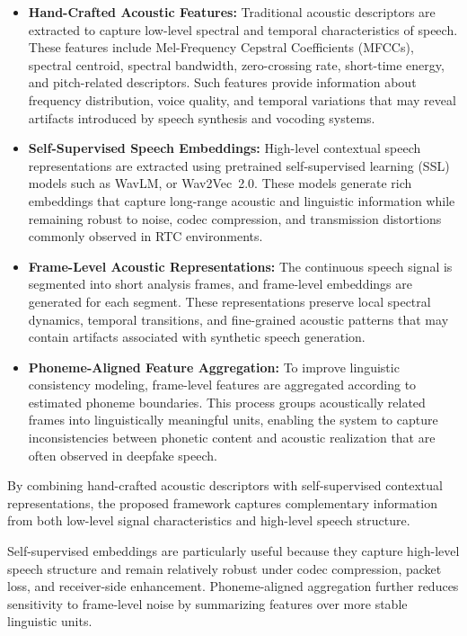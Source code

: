 \begin{itemize}

    \item \textbf{Hand-Crafted Acoustic Features:}
    Traditional acoustic descriptors are extracted to capture low-level spectral and temporal characteristics of speech. These features include Mel-Frequency Cepstral Coefficients (MFCCs), spectral centroid, spectral bandwidth, zero-crossing rate, short-time energy, and pitch-related descriptors. Such features provide information about frequency distribution, voice quality, and temporal variations that may reveal artifacts introduced by speech synthesis and vocoding systems.

    \item \textbf{Self-Supervised Speech Embeddings:}
    High-level contextual speech representations are extracted using pretrained self-supervised learning (SSL) models such as WavLM, or Wav2Vec~2.0. These models generate rich embeddings that capture long-range acoustic and linguistic information while remaining robust to noise, codec compression, and transmission distortions commonly observed in RTC environments.

    \item \textbf{Frame-Level Acoustic Representations:}
    The continuous speech signal is segmented into short analysis frames, and frame-level embeddings are generated for each segment. These representations preserve local spectral dynamics, temporal transitions, and fine-grained acoustic patterns that may contain artifacts associated with synthetic speech generation.

    \item \textbf{Phoneme-Aligned Feature Aggregation:}
    To improve linguistic consistency modeling, frame-level features are aggregated according to estimated phoneme boundaries. This process groups acoustically related frames into linguistically meaningful units, enabling the system to capture inconsistencies between phonetic content and acoustic realization that are often observed in deepfake speech.

\end{itemize}

By combining hand-crafted acoustic descriptors with self-supervised contextual representations, the proposed framework captures complementary information from both low-level signal characteristics and high-level speech structure.

Self-supervised embeddings are particularly useful because they capture high-level speech structure and remain relatively robust under codec compression, packet loss, and receiver-side enhancement. Phoneme-aligned aggregation further reduces sensitivity to frame-level noise by summarizing features over more stable linguistic units.

